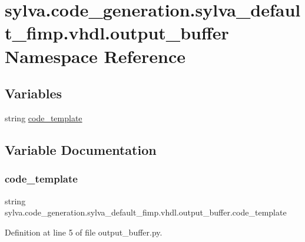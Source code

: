 \hypertarget{namespacesylva_1_1code__generation_1_1sylva__default__fimp_1_1vhdl_1_1output__buffer}{}\section{sylva.\+code\+\_\+generation.\+sylva\+\_\+default\+\_\+fimp.\+vhdl.\+output\+\_\+buffer Namespace Reference}
\label{namespacesylva_1_1code__generation_1_1sylva__default__fimp_1_1vhdl_1_1output__buffer}
\subsection*{Variables}
\begin{DoxyCompactItemize}
\item 
string \hyperlink{namespacesylva_1_1code__generation_1_1sylva__default__fimp_1_1vhdl_1_1output__buffer_ab6b2d6fded8bc3e5835345d3ea40457f}{code\+\_\+template}
\end{DoxyCompactItemize}


\subsection{Variable Documentation}
\mbox{\label{namespacesylva_1_1code__generation_1_1sylva__default__fimp_1_1vhdl_1_1output__buffer_ab6b2d6fded8bc3e5835345d3ea40457f}} 
\subsubsection{\texorpdfstring{code\+\_\+template}{code\_template}}
{\footnotesize\ttfamily string sylva.\+code\+\_\+generation.\+sylva\+\_\+default\+\_\+fimp.\+vhdl.\+output\+\_\+buffer.\+code\+\_\+template}



Definition at line 5 of file output\+\_\+buffer.\+py.

